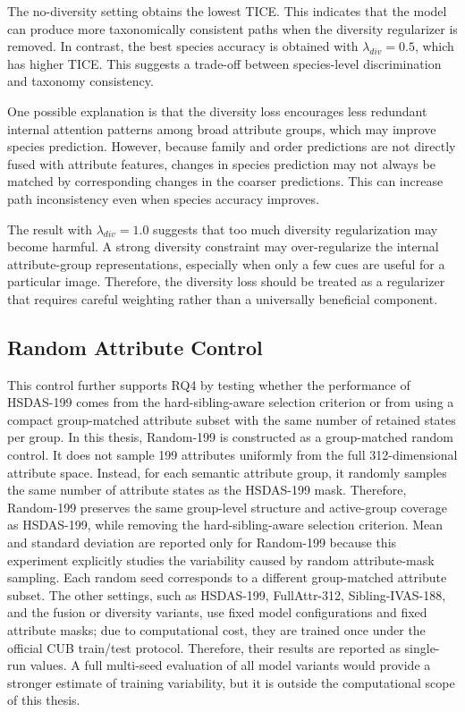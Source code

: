 The no-diversity setting obtains the lowest TICE. This indicates that the model can produce more taxonomically consistent paths when the diversity regularizer is removed. In contrast, the best species accuracy is obtained with \(\lambda_{div}=0.5\), which has higher TICE. This suggests a trade-off between species-level discrimination and taxonomy consistency.

One possible explanation is that the diversity loss encourages less redundant internal attention patterns among broad attribute groups, which may improve species prediction. However, because family and order predictions are not directly fused with attribute features, changes in species prediction may not always be matched by corresponding changes in the coarser predictions. This can increase path inconsistency even when species accuracy improves.

The result with \(\lambda_{div}=1.0\) suggests that too much diversity regularization may become harmful. A strong diversity constraint may over-regularize the internal attribute-group representations, especially when only a few cues are useful for a particular image. Therefore, the diversity loss should be treated as a regularizer that requires careful weighting rather than a universally beneficial component.









\subsection{Random Attribute Control}

This control further supports RQ4 by testing whether the performance of HSDAS-199 comes from the hard-sibling-aware selection criterion or from using a compact group-matched attribute subset with the same number of retained states per group. In this thesis, Random-199 is constructed as a group-matched random control. It does not sample 199 attributes uniformly from the full 312-dimensional attribute space. Instead, for each semantic attribute group, it randomly samples the same number of attribute states as the HSDAS-199 mask. Therefore, Random-199 preserves the same group-level structure and active-group coverage as HSDAS-199, while removing the hard-sibling-aware selection criterion.
Mean and standard deviation are reported only for Random-199 because this experiment explicitly studies the variability caused by random attribute-mask sampling. Each random seed corresponds to a different group-matched attribute subset. The other settings, such as HSDAS-199, FullAttr-312, Sibling-IVAS-188, and the fusion or diversity variants, use fixed model configurations and fixed attribute masks; due to computational cost, they are trained once under the official CUB train/test protocol. Therefore, their results are reported as single-run values. A full multi-seed evaluation of all model variants would provide a stronger estimate of training variability, but it is outside the computational scope of this thesis.

